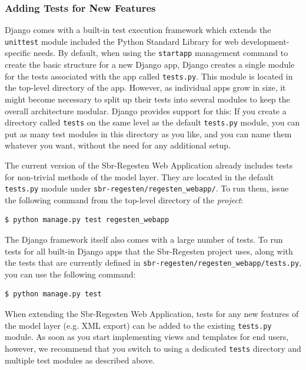 \subsubsection{Adding Tests for New Features}
\label{sec:test}

Django comes with a built-in test execution framework which extends
the \texttt{unittest} module included the Python Standard Library for
web development-specific needs. By default, when using the
\texttt{startapp} management command to create the basic structure for
a new Django app, Django creates a single module for the tests
associated with the app called \texttt{tests.py}. This module is
located in the top-level directory of the app. However, as individual
apps grow in size, it might become necessary to split up their tests
into several modules to keep the overall architecture modular. Django
provides support for this: If you create a directory called
\texttt{tests} on the same level as the default \texttt{tests.py}
module, you can put as many test modules in this directory as you
like, and you can name them whatever you want, without the need for
any additional setup.

The current version of the Sbr-Regesten Web Application already
includes tests for non-trivial methods of the model layer. They are
located in the default \texttt{tests.py} module under
\texttt{sbr-regesten/regesten\_webapp/}. To run them, issue the
following command from the top-level directory of the \emph{project}:

\begin{verbatim}
$ python manage.py test regesten_webapp
\end{verbatim}

The Django framework itself also comes with a large number of tests.
To run tests for all built-in Django apps that the Sbr-Regesten
project uses, along with the tests that are currently defined in
\texttt{sbr-regesten/regesten\_webapp/tests.py}, you can use the
following command:

\begin{verbatim}
$ python manage.py test
\end{verbatim}

When extending the Sbr-Regesten Web Application, tests for any new
features of the model layer (e.g. XML export) can be added to the
existing \texttt{tests.py} module. As soon as you start implementing
views and templates for end users, however, we recommend that you
switch to using a dedicated \texttt{tests} directory and multiple test
modules as described above.

